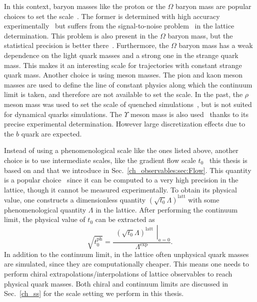 In this context, baryon masses like the proton or the $\Omega$ baryon mass are popular choices to set the scale~\citep{RQCD_scale}. The former is determined with high accuracy experimentally~\citep{ParticleDataGroup:2020ssz} but suffers from the signal-to-noise problem~\citep{Lepage:1989hd,Luscher:2010ae} in the lattice determination. This problem is also present in the $\Omega$ baryon mass, but the statistical precision is better there~\citep{RQCD_scale}. Furthermore, the $\Omega$ baryon mass has a weak dependence on the light quark masses and a strong one in the strange quark mass. This makes it an interesting scale for trajectories with constant strange quark mass. Another choice is using meson masses. The pion and kaon meson masses are used to define the line of constant physics along which the continuum limit is taken, and therefore are not available to set the scale. In the past, the $\rho$ meson mass was used to set the scale of quenched simulations~\citep{Mawhinney:1996jk,Irving:1998yu,Bornyakov:2015plz}, but is not suited for dynamical quarks simulations. The $\Upsilon$ meson mass is also used~\citep{HPQCD:2011qw,Gray:2005ur} thanks to its precise experimental determination. However large discretization effects due to the $b$ quark are expected. 

Instead of using a phenomenological scale like the ones listed above, another choice is to use intermediate scales, like the gradient flow scale $t_0$~\citep{Luscher:2010we,1006.4518} this thesis is based on and that we introduce in Sec.~\ref{ch_observables:sec:Flow}. This quantity is a popular choice~\citep{Bruno:2016plf,Strassberger:2023xnj,RQCD_scale,Kostrzewa:2021syw,Hollwieser:2020qri,MILC:2015tqx} since it can be computed to a very high precision in the lattice, though it cannot be measured experimentally. To obtain its physical value, one constructs a dimensionless quantity $(\sqrt{t_0}\Lambda)^{\textrm{latt}}$ with some phenomenological quantity $\Lambda$ in the lattice. After performing the continuum limit, the physical value of $t_0$ can be extracted as
\begin{equation}
\label{ch_foundation:eq:Lambda}
\sqrt{t_0^{\textrm{ph}}}=\frac{\left.\begin{matrix}
\left(\sqrt{t_0}\Lambda\right)^{\textrm{latt}}
\end{matrix}\right|_{a=0}}{\Lambda^{\textrm{exp}}}.
\end{equation}
In addition to the continuum limit, in the lattice often unphysical quark masses are simulated, since they are computationally cheaper. This means one needs to perform chiral extrapolations/interpolations of lattice observables to reach physical quark masses. Both chiral and continuum limits are discussed in Sec.~\ref{ch_ss} for the scale setting we perform in this thesis.

